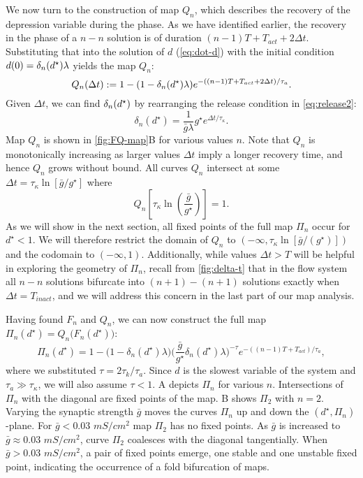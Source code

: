 We now turn to the construction of map $Q_n$, which describes the recovery of the depression variable during the \suppressed{} phase.
As we have identified earlier, the recovery in the \suppressed{} phase of a $n-n$ solution is of duration $(n-1)T + T_{act} + 2\Delta t$.
Substituting that into the solution of $d$ (\cref{eq:dot-d}) with the initial condition $d(0)=\delta_n(d^\star) \lambda$ yields the map $Q_{n}$:
\begin{equation}
	\label{eq:Qn-map}
	Q_n(\Delta t) := 1- (1- \delta_n(d^\star) \lambda)e^{-((n-1)T + T_{act} + 2\Delta t)/\tau_a}.
\end{equation}
Given $\Delta t$, we can find $\delta_n(d^\star)$ by rearranging the release condition in \cref{eq:release2}:
\begin{equation}
	\label{eq:dn}
	\delta_n(d^\star) = \frac{1}{\bar g \lambda} g^\star e^{\Delta t/\tau_\kappa}.
\end{equation}
Map $Q_n$ is shown in \cref{fig:FQ-map}B for various values $n$.
Note that $Q_n$ is monotonically increasing as larger values $\Delta t$ imply a longer recovery time, and hence $Q_{n}$ grows without bound.
All curves $Q_{n}$ intersect at some $\Delta t = \tau_\kappa\ln{\left[\bar g/g^\star\right]}$ where
\begin{equation}
	\label{eq:Qn-intersect}
	Q_n\left[\tau_\kappa\ln{\left(\frac{\bar g}{g^\star}\right)}\right]=1.
\end{equation}
As we will show in the next section, all fixed points of the full map $\Pi_n$ occur for $d^\star<1$.
We will therefore restrict the domain of $Q_n$ to $(-\infty, \tau_\kappa\ln{\left[\bar g/(g^\star)\right]})$ and the codomain to $(-\infty, 1)$.
Additionally, while values $\Delta t>T$ will be helpful in exploring the geometry of $\Pi_{n}$, recall from \cref{fig:delta-t} that in the flow system all $n-n$ solutions bifurcate into $(n+1)-(n+1)$ solutions exactly when $\Delta t = T_{inact}$, and we will address this concern in the last part of our map analysis.

Having found $F_n$ and $Q_n$, we can now construct the full map $\Pi_n(d^\star)=Q_n\big(F_n(d^\star)\big)$:
\begin{equation}
	\label{eq:Pn-map}
	\Pi_n(d^\star) = 1 - \Big(1 - \delta_n(d^\star) \lambda \Big)
	\Big(\frac{\bar g}{g^\star}\delta_n(d^\star) \lambda \Big)^{-\tau}
	e^{-((n-1)T + T_{act})/\tau_a},
\end{equation}
where we substituted $\tau = 2\tau_{k}/\tau_{a}$.
Since $d$ is the slowest variable of the system and $\tau_a \gg \tau_\kappa$, we will also assume $\tau<1$.
A depicts $\Pi_n$ for various $n$.
Intersections of $\Pi_{n}$ with the diagonal are fixed points of the map.
B shows $\Pi_{2}$ with $n=2$.
Varying the synaptic strength $\bar g$ moves the curves $\Pi_{n}$ up and down the $(d^{\star}, \Pi_{n})$-plane.
For $\bar g < 0.03$ $\si{mS/cm^{2}}$ map $\Pi_{2}$ has no fixed points.
As $\bar g$ is increased to $\bar g \approx 0.03$ $\si{mS/cm^{2}}$, curve $\Pi_{2}$ coalesces with the diagonal tangentially.
When $\bar g > 0.03$ $\si{mS/cm^{2}}$, a pair of fixed points emerge, one stable and one unstable fixed point, indicating the occurrence of a fold bifurcation of maps.


